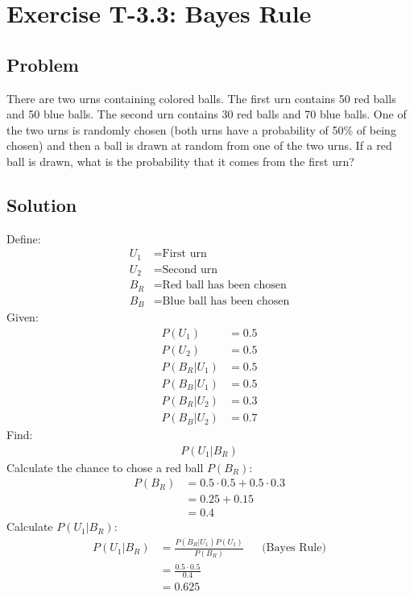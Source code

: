 \section*{Exercise T-3.3: Bayes Rule}

\subsection*{Problem}
There are two urns containing colored balls. The first urn contains 50 red balls and 50 blue balls. The second urn contains 30 red balls and 70 blue balls. One of the two urns is randomly chosen (both urns have a probability of 50\% of being chosen) and then a ball is drawn at random from one of the two urns. If a red ball is drawn, what is the probability that it comes from the first urn?


\subsection*{Solution}
Define:
\begin{align}
	U_1 &= \text{First urn}\nonumber \\
	U_2 &= \text{Second urn}\nonumber \\
	B_R &= \text{Red ball has been chosen}\nonumber \\
	B_B &= \text{Blue ball has been chosen}\nonumber
\end{align}
Given:
\begin{align}
	P(U_1) &= 0.5 \nonumber \\
	P(U_2) &= 0.5 \nonumber \\
	P(B_R|U_1) &= 0.5 \nonumber \\
	P(B_B|U_1) &= 0.5 \nonumber \\
	P(B_R|U_2) &= 0.3 \nonumber \\
	P(B_B|U_2) &= 0.7 \nonumber
\end{align}
Find:
\begin{align}
P(U_1|B_R) \nonumber
\end{align}
Calculate the chance to chose a red ball $P(B_R)$:
\begin{align}
	P(B_R) &= 0.5 \cdot 0.5 + 0.5 \cdot 0.3 \nonumber \\
	&= 0.25 + 0.15 \nonumber \\
	&= 0.4 \nonumber 
\end{align}
Calculate $P(U_1|B_R)$:
\begin{align}
P(U_1|B_R) &= \frac{P(B_R|U_1) P(U_1)}{P(B_R)} && \text{(Bayes Rule)} \nonumber \\
&= \frac{0.5 \cdot 0.5}{0.4} \nonumber \\
&= 0.625 \nonumber
\end{align}










